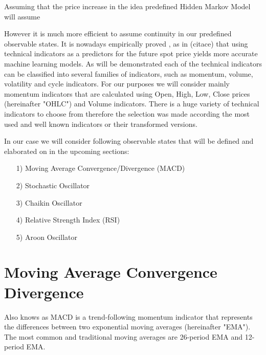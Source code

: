 Assuming that the price increase in   the idea predefined Hidden Markov Model will assume
	
	However it is much more efficient to assume continuity in our predefined observable states. It is nowadays empirically proved , as in (citace) that using technical indicators as a predictors for the future spot price yields more accurate machine learning models. As will be demonstrated each of the technical indicators can be classified into several families of indicators, such as momentum, volume, volatility and cycle indicators. For our purposes we will consider mainly momentum indicators that are calculated using Open, High, Low, Close prices (hereinafter "OHLC") and Volume indicators. There is a huge variety of technical indicators to choose from therefore the selection was made according the most used and well known indicators or their transformed versions. 

In our case we will consider following observable states that will be defined and elaborated on in the upcoming sections:

\begin{itemize}
\item[1)] Moving Average Convergence/Divergence (MACD)
\item[2)] Stochastic Oscillator
\item[3)] Chaikin Oscillator 
\item[4)] Relative Strength Index (RSI)
\item[5)] Aroon Oscillator 
\end{itemize}


\section{Moving Average Convergence Divergence}

Also knows as MACD is a trend-following momentum indicator that represents the differences between two exponential moving averages (hereinafter "EMA"). The most common and traditional moving averages are 26-period EMA and 12-period EMA. 

